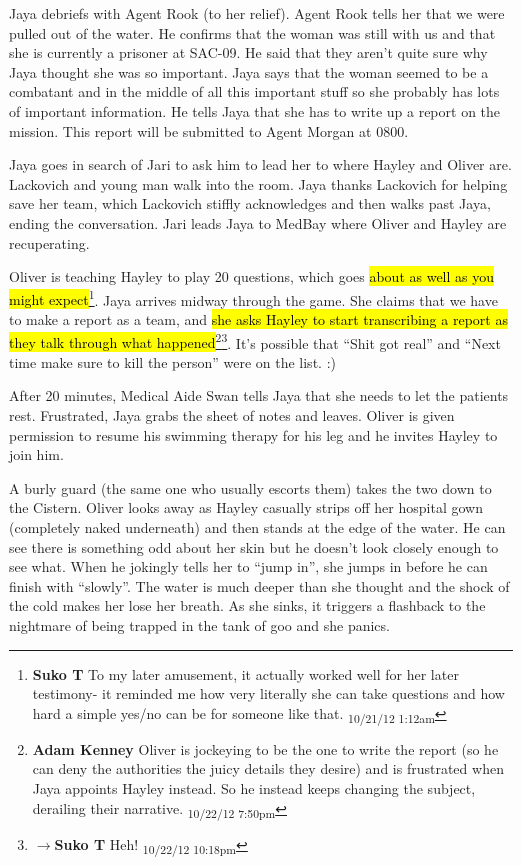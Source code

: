 Jaya debriefs with Agent Rook (to her relief). Agent Rook tells her that we were pulled out of the water. He confirms that the woman was still with us and that she is currently a prisoner at SAC-09.  He said that they aren't quite sure why Jaya thought she was so important. Jaya says that the woman seemed to be a combatant and in the middle of all this important stuff so she probably has lots of important information.  He tells Jaya that she has to write up a report on the mission.  This report will be submitted to Agent Morgan at 0800.  



Jaya goes in search of Jari to ask him to lead her to where Hayley and Oliver are.  Lackovich and young man walk into the room.  Jaya thanks Lackovich for helping save her team, which Lackovich stiffly acknowledges and then walks past Jaya, ending the conversation.  Jari leads Jaya to MedBay where Oliver and Hayley are recuperating.



Oliver is teaching Hayley to play 20 questions, which goes \hl{about as well as you might expect}\footnote{\textbf{Suko T }To my later amusement, it actually worked well for her later testimony- it reminded me how very literally she can take questions and how hard a simple yes/no can be for someone like that. \textsubscript{10/21/12 1:12am}}. Jaya arrives midway through the game.  She claims that we have to make a report as a team, and \hl{she asks Hayley to start transcribing a report as they talk through what happened}\footnote{\textbf{Adam Kenney }Oliver is jockeying to be the one to write the report (so he can deny the authorities the juicy details they desire) and is frustrated when Jaya appoints Hayley instead.  So he instead keeps changing the subject, derailing their narrative. \textsubscript{10/22/12 7:50pm}}\footnote{$\rightarrow$\textbf{Suko T }Heh! \textsubscript{10/22/12 10:18pm}}.  It's possible that ``Shit got real'' and ``Next time make sure to kill the person'' were on the list. :)



After 20 minutes, Medical Aide Swan tells Jaya that she needs to let the patients rest.  Frustrated, Jaya grabs the sheet of notes and leaves.  Oliver is given permission to resume his swimming therapy for his leg and he invites Hayley to join him.



A burly guard (the same one who usually escorts them) takes the two down to the Cistern.  Oliver looks away as Hayley casually strips off her hospital gown (completely naked underneath) and then stands at the edge of the water.  He can see there is something odd about her skin but he doesn't look closely enough to see what.  When he jokingly tells her to ``jump in'', she jumps in before he can finish with ``slowly''.  The water is much deeper than she thought and the shock of the cold makes her lose her breath.  As she sinks, it triggers a flashback to the nightmare of being trapped in the tank of goo and she panics.



